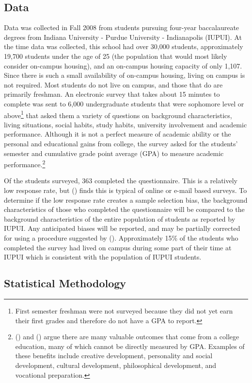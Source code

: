 \documentclass[11pt]{article}
\newcommand{\citee}[1]{\citename{#1} (\citeyear{#1})}
\begin{document}
\subsection{Data}
Data was collected in Fall 2008 from students pursuing four-year baccalaureate degrees from Indiana University - Purdue University - Indianapolis (IUPUI).  At the time data was collected, this school had over 30,000 students, approximately 19,700 students under the age of 25 (the population that would most likely consider on-campus housing), and an on-campus housing capacity of only 1,107.  Since there is such a small availability of on-campus housing, living on campus is not required.  Most students do not live on campus, and those that do are primarily freshman.  An electronic survey that takes about 15 minutes to complete was sent to 6,000 undergraduate students that were sophomore level or above\footnote{First semester freshman were not surveyed because they did not yet earn their first grades and therefore do not have a GPA to report.} that asked them a variety of questions on background characteristics, living situations, social habits, study habits, university involvement and academic performance.  Although it is not a perfect measure of academic ability or the personal and educational gains from college, the survey asked for the students' semester and cumulative grade point average (GPA) to measure academic performance.\footnote{\citee{lvb1975} and \citee{kpv1997} argue there are many valuable outcomes that come from a college education, many of which cannot be directly measured by GPA.  Examples of these benefits include creative development, personality and social development, cultural development, philosophical development, and vocational preparation.}  

Of the students surveyed, 363 completed the questionnaire.  This is a relatively low response rate, but \citee{sax2003} finds this is typical of online or e-mail based surveys.  To determine if the low response rate creates a sample selection bias, the background characteristics of those who completed the questionnaire will be compared to the background characteristics of the entire population of students as reported by IUPUI.  Any anticipated biases will be reported, and may be partially corrected for using a procedure suggested by \citee{heckman1979}.  Approximately 15\% of the students who completed the survey had lived on campus during some part of their time at IUPUI which is consistent with the population of IUPUI students.

\subsection{Statistical Methodology}
\end{document}
